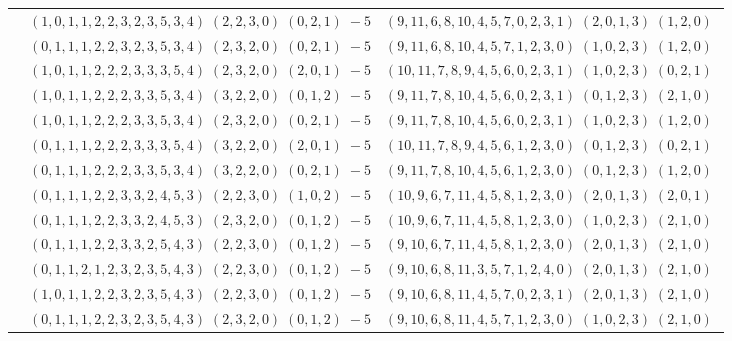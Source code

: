 \documentclass[11pt]{article}
\begin{document}
\begin{longtable}[l]{|c|c|c|}
 \cline{2-3} 
 & $(1 ,0 ,1 ,1 ,2 ,2 ,3 ,2 ,3 ,5 ,3 ,4) \;(2 ,2 ,3 ,0) \;(0 ,2 ,1) \;-5$ & $(9 ,11 ,6 ,8 ,10 ,4 ,5 ,7 ,0 ,2 ,3 ,1) \;(2 ,0 ,1 ,3) \;(1 ,2 ,0) \;$\\ 
 \cline{2-3} 
 & $(0 ,1 ,1 ,1 ,2 ,2 ,3 ,2 ,3 ,5 ,3 ,4) \;(2 ,3 ,2 ,0) \;(0 ,2 ,1) \;-5$ & $(9 ,11 ,6 ,8 ,10 ,4 ,5 ,7 ,1 ,2 ,3 ,0) \;(1 ,0 ,2 ,3) \;(1 ,2 ,0) \;$\\ 
 \cline{2-3} 
 & $(1 ,0 ,1 ,1 ,2 ,2 ,2 ,3 ,3 ,3 ,5 ,4) \;(2 ,3 ,2 ,0) \;(2 ,0 ,1) \;-5$ & $(10 ,11 ,7 ,8 ,9 ,4 ,5 ,6 ,0 ,2 ,3 ,1) \;(1 ,0 ,2 ,3) \;(0 ,2 ,1) \;$\\ 
 \cline{2-3} 
 & $(1 ,0 ,1 ,1 ,2 ,2 ,2 ,3 ,3 ,5 ,3 ,4) \;(3 ,2 ,2 ,0) \;(0 ,1 ,2) \;-5$ & $(9 ,11 ,7 ,8 ,10 ,4 ,5 ,6 ,0 ,2 ,3 ,1) \;(0 ,1 ,2 ,3) \;(2 ,1 ,0) \;$\\ 
 \cline{2-3} 
 & $(1 ,0 ,1 ,1 ,2 ,2 ,2 ,3 ,3 ,5 ,3 ,4) \;(2 ,3 ,2 ,0) \;(0 ,2 ,1) \;-5$ & $(9 ,11 ,7 ,8 ,10 ,4 ,5 ,6 ,0 ,2 ,3 ,1) \;(1 ,0 ,2 ,3) \;(1 ,2 ,0) \;$\\ 
 \cline{2-3} 
 & $(0 ,1 ,1 ,1 ,2 ,2 ,2 ,3 ,3 ,3 ,5 ,4) \;(3 ,2 ,2 ,0) \;(2 ,0 ,1) \;-5$ & $(10 ,11 ,7 ,8 ,9 ,4 ,5 ,6 ,1 ,2 ,3 ,0) \;(0 ,1 ,2 ,3) \;(0 ,2 ,1) \;$\\ 
 \cline{2-3} 
 & $(0 ,1 ,1 ,1 ,2 ,2 ,2 ,3 ,3 ,5 ,3 ,4) \;(3 ,2 ,2 ,0) \;(0 ,2 ,1) \;-5$ & $(9 ,11 ,7 ,8 ,10 ,4 ,5 ,6 ,1 ,2 ,3 ,0) \;(0 ,1 ,2 ,3) \;(1 ,2 ,0) \;$\\ 
 \cline{2-3} 
 & $(0 ,1 ,1 ,1 ,2 ,2 ,3 ,3 ,2 ,4 ,5 ,3) \;(2 ,2 ,3 ,0) \;(1 ,0 ,2) \;-5$ & $(10 ,9 ,6 ,7 ,11 ,4 ,5 ,8 ,1 ,2 ,3 ,0) \;(2 ,0 ,1 ,3) \;(2 ,0 ,1) \;$\\ 
 \cline{2-3} 
 & $(0 ,1 ,1 ,1 ,2 ,2 ,3 ,3 ,2 ,4 ,5 ,3) \;(2 ,3 ,2 ,0) \;(0 ,1 ,2) \;-5$ & $(10 ,9 ,6 ,7 ,11 ,4 ,5 ,8 ,1 ,2 ,3 ,0) \;(1 ,0 ,2 ,3) \;(2 ,1 ,0) \;$\\ 
 \cline{2-3} 
 & $(0 ,1 ,1 ,1 ,2 ,2 ,3 ,3 ,2 ,5 ,4 ,3) \;(2 ,2 ,3 ,0) \;(0 ,1 ,2) \;-5$ & $(9 ,10 ,6 ,7 ,11 ,4 ,5 ,8 ,1 ,2 ,3 ,0) \;(2 ,0 ,1 ,3) \;(2 ,1 ,0) \;$\\ 
 \cline{2-3} 
 & $(0 ,1 ,1 ,2 ,1 ,2 ,3 ,2 ,3 ,5 ,4 ,3) \;(2 ,2 ,3 ,0) \;(0 ,1 ,2) \;-5$ & $(9 ,10 ,6 ,8 ,11 ,3 ,5 ,7 ,1 ,2 ,4 ,0) \;(2 ,0 ,1 ,3) \;(2 ,1 ,0) \;$\\ 
 \cline{2-3} 
 & $(1 ,0 ,1 ,1 ,2 ,2 ,3 ,2 ,3 ,5 ,4 ,3) \;(2 ,2 ,3 ,0) \;(0 ,1 ,2) \;-5$ & $(9 ,10 ,6 ,8 ,11 ,4 ,5 ,7 ,0 ,2 ,3 ,1) \;(2 ,0 ,1 ,3) \;(2 ,1 ,0) \;$\\ 
 \cline{2-3} 
 & $(0 ,1 ,1 ,1 ,2 ,2 ,3 ,2 ,3 ,5 ,4 ,3) \;(2 ,3 ,2 ,0) \;(0 ,1 ,2) \;-5$ & $(9 ,10 ,6 ,8 ,11 ,4 ,5 ,7 ,1 ,2 ,3 ,0) \;(1 ,0 ,2 ,3) \;(2 ,1 ,0) \;$\\ 

\end{longtable}
\end{document}

